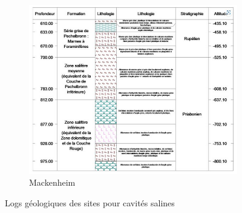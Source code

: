 \documentclass[11pt,french,a4paper]{article}
\begin{document}
\begin{figure}
\begin{subfigure}[b]{0.48\textwidth}
         \includegraphics[width=\textwidth]{image/annexe/chap4/salines/mackenheim.png}
         \caption{Mackenheim}
     \end{subfigure}
        \caption{Logs géologiques des sites pour cavités salines}
\end{figure}
\end{document}
